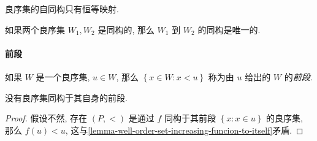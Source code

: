 \begin{corollary}
  良序集的自同构只有恒等映射.
\end{corollary}

\begin{corollary}
  如果两个良序集 \( W_1, W_2 \) 是同构的, 那么 \( W_1 \) 到 \( W_2 \)
  的同构是唯一的.
\end{corollary}

\paragraph{前段} 如果 \( W \) 是一个良序集, \( u \in W \), 那么 \( \left\lbrace
x \in W: x < u \right\rbrace \) 称为由 \( u \) 给出的 \( W \) 的\emph{前段}.

\begin{lemma}
  \label{lemma-well-order-set-not-isomorphic-to-its-initial-segment}
  没有良序集同构于其自身的前段.
\end{lemma}
\begin{proof}
  假设不然, 存在 \( (P, <) \) 是通过 \( f \) 同构于其前段 \( \left\lbrace x: x
  \in u \right\rbrace \) 的良序集, 那么 \( f(u) < u \),
  这与\cref{lemma-well-order-set-increasing-funcion-to-itself}矛盾.
\end{proof}

